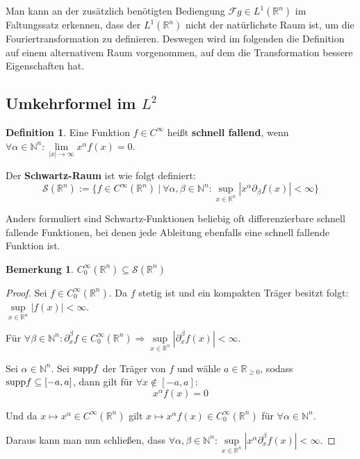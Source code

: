 \documentclass{article}
\newcommand{\R}[0]{\mathbb{R}}
\newcommand{\N}[0]{\mathbb{N}}
\newcommand{\Ssp}[0]{\mathcal{S}}
\newcommand{\C}[0]{C^{\infty}_0}
\theoremstyle{plain}
\theoremstyle{definition}
\newtheorem{defin}[thm]{Definition}
\newtheorem{bem}[thm]{Bemerkung}
\begin{document}
Man kann an der zusätzlich benötigten Bediengung $\mathcal{F}g \in L^1(\R^n)$ im Faltungssatz erkennen, dass der $L^1(\R^n)$ nicht der natürlichste Raum ist, um die Fouriertransformation zu definieren.
Deswegen wird im folgenden die Definition auf einem alternativem Raum vorgenommen, auf dem die Transformation bessere Eigenschaften hat.

\subsection{Umkehrformel im $L^2$}

\begin{defin}
    Eine Funktion $f \in C^{\infty}$ heißt \textbf{schnell fallend}, wenn $\forall \alpha \in \N^n: \lim\limits_{|x| \to \infty} x^{\alpha}f(x) = 0$.

    Der \textbf{Schwartz-Raum} ist wie folgt definiert:
    \begin{equation*}
        \Ssp(\R^n) := \{ f \in C^{\infty}(\R^n) \: | \: \forall \alpha,\beta \in \N^n: \sup\limits_{x \in \R^n} \left| x^\alpha\partial_{\beta}f(x) \right| < \infty \}
    \end{equation*}
\end{defin}
Anders formuliert sind Schwartz-Funktionen beliebig oft differenzierbare schnell fallende Funktionen, bei denen jede Ableitung ebenfalls eine schnell fallende Funktion ist.

\begin{bem}\label{bem:C0sub}
    $C^{\infty}_0(\R^n) \subseteq \Ssp(\R^n)$
\end{bem}

\begin{proof}
    Sei $f \in \C(\R^n)$. Da $f$ stetig ist und ein kompakten Träger besitzt folgt: $\sup\limits_{x \in \R^n} |f(x)| < \infty$.

    Für $\forall \beta \in \N^n: \partial_x^{\beta} f \in \C(\R^n) \Rightarrow \sup\limits_{x \in \R^n} |\partial_x^{\beta}f(x)| < \infty$.

    Sei $\alpha \in \N^n$. Sei ${\rm supp} f$ der Träger von $f$ und wähle $a \in \R_{\geq 0}$, sodass ${\rm supp}f \subseteq [-a, a]$, dann gilt für $\forall x \notin [-a, a]$:
    \begin{equation}
        x^{\alpha}f(x) = 0
    \end{equation}

    Und da $x \mapsto x^{\alpha} \in C^{\infty}(\R^n)$ gilt $x \mapsto x^{\alpha}f(x) \in \C(\R^n)$ für $\forall \alpha \in \N^n$.
    
    Daraus kann man nun schließen, dass $\forall \alpha, \beta \in \N^n: \sup\limits_{x \in \R^n} |x^{\alpha}\partial_x^{\beta}f(x)| < \infty$.
\end{proof}
\end{document}
